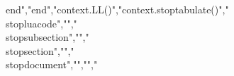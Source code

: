end","end","context.LL()","context.stoptabulate()","\\stopluacode","","\\stopsubsection","","\\stopsection","","\\stopdocument","","","%